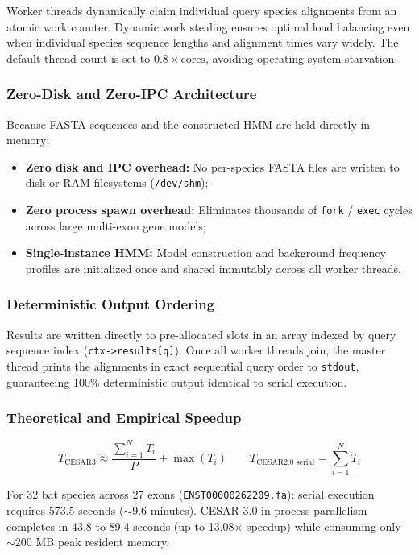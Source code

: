 \documentclass[12pt,a4paper]{article}
\begin{document}
Worker threads dynamically claim individual query species alignments from an atomic
work counter. Dynamic work stealing ensures optimal load balancing even when individual
species sequence lengths and alignment times vary widely. The default thread count is
set to $0.8 \times \text{cores}$, avoiding operating system starvation.

\subsubsection{Zero-Disk and Zero-IPC Architecture}

Because FASTA sequences and the constructed HMM are held directly in memory:
\begin{itemize}
  \item \textbf{Zero disk and IPC overhead:} No per-species FASTA files are written to disk
        or RAM filesystems (\texttt{/dev/shm});
  \item \textbf{Zero process spawn overhead:} Eliminates thousands of \texttt{fork} / \texttt{exec}
        cycles across large multi-exon gene models;
  \item \textbf{Single-instance HMM:} Model construction and background frequency profiles
        are initialized once and shared immutably across all worker threads.
\end{itemize}

\subsubsection{Deterministic Output Ordering}

Results are written directly to pre-allocated slots in an array indexed by query sequence index
(\texttt{ctx->results[q]}). Once all worker threads join, the master thread prints the alignments
in exact sequential query order to \texttt{stdout}, guaranteeing 100\% deterministic output
identical to serial execution.

\subsubsection{Theoretical and Empirical Speedup}

\[
T_{\text{CESAR3}} \approx \frac{\sum_{i=1}^{N} T_i}{P} + \max(T_i) \qquad
T_{\text{CESAR2.0 serial}} = \sum_{i=1}^{N} T_i
\]

For 32 bat species across 27 exons (\texttt{ENST00000262209.fa}):
serial execution requires 573.5 seconds ($\sim$9.6 minutes).
CESAR 3.0 in-process parallelism completes in 43.8 to 89.4 seconds (up to 13.08$\times$ speedup)
while consuming only $\sim$200 MB peak resident memory.
\end{document}
